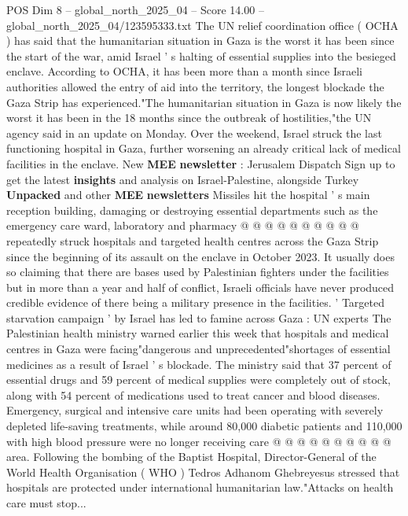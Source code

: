 \begin{textsample}{POS Dim 8 – global\_north\_2025\_04 – Score 14.00 – global\_north\_2025\_04/123595333.txt}  \label{ex:f8_pos_024}
The UN relief coordination office ( OCHA ) has said that the humanitarian situation in Gaza is the worst it has been since the start of the war, amid Israel ' s halting of essential supplies into the besieged enclave.
According to OCHA, it has been more than a month since Israeli authorities allowed the entry of aid into the territory, the longest blockade the Gaza Strip has experienced."The humanitarian situation in Gaza is now likely the worst it has been in the 18 months since the outbreak of hostilities,"the UN agency said in an update on Monday.
Over the weekend, Israel struck the last functioning hospital in Gaza, further worsening an already critical lack of medical facilities in the enclave.
New \textbf{MEE} \textbf{newsletter} : Jerusalem Dispatch Sign up to get the latest \textbf{insights} and analysis on Israel-Palestine, alongside Turkey \textbf{Unpacked} and other \textbf{MEE} \textbf{newsletters} Missiles hit the hospital ' s main reception building, damaging or destroying essential departments such as the emergency care ward, laboratory and pharmacy @ @ @ @ @ @ @ @ @ @ repeatedly struck hospitals and targeted health centres across the Gaza Strip since the beginning of its assault on the enclave in October 2023.
It usually does so claiming that there are bases used by Palestinian fighters under the facilities but in more than a year and half of conflict, Israeli officials have never produced credible evidence of there being a military presence in the facilities. ' Targeted starvation campaign ' by Israel has led to famine across Gaza : UN experts The Palestinian health ministry warned earlier this week that hospitals and medical centres in Gaza were facing"dangerous and unprecedented"shortages of essential medicines as a result of Israel ' s blockade.
The ministry said that 37 percent of essential drugs and 59 percent of medical supplies were completely out of stock, along with 54 percent of medications used to treat cancer and blood diseases.
Emergency, surgical and intensive care units had been operating with severely depleted life-saving treatments, while around 80,000 diabetic patients and 110,000 with high blood pressure were no longer receiving care @ @ @ @ @ @ @ @ @ @ area.
Following the bombing of the Baptist Hospital, Director-General of the World Health Organisation ( WHO ) Tedros Adhanom Ghebreyesus stressed that hospitals are protected under international humanitarian law."Attacks on health care must stop...

\end{textsample}
